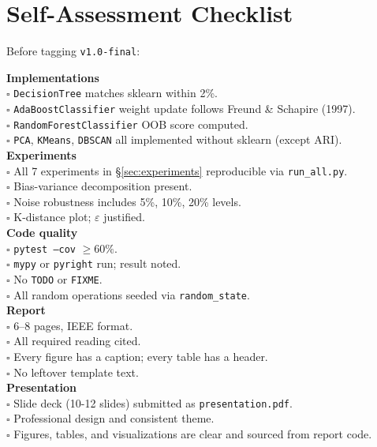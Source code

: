 \documentclass[11pt,a4paper]{article}
\begin{document}
\section{Self-Assessment Checklist}
Before tagging \texttt{v1.0-final}:
\begin{rubricbox}
\textbf{Implementations}\\
$\square$ \texttt{DecisionTree} matches sklearn within 2\%.\\
$\square$ \texttt{AdaBoostClassifier} weight update follows Freund \& Schapire (1997).\\
$\square$ \texttt{RandomForestClassifier} OOB score computed.\\
$\square$ \texttt{PCA}, \texttt{KMeans}, \texttt{DBSCAN} all implemented without sklearn (except ARI).\\
\smallskip\textbf{Experiments}\\
$\square$ All 7 experiments in \S\ref{sec:experiments} reproducible via \texttt{run\_all.py}.\\
$\square$ Bias-variance decomposition present.\\
$\square$ Noise robustness includes 5\%, 10\%, 20\% levels.\\
$\square$ K-distance plot; $\varepsilon$ justified.\\
\smallskip\textbf{Code quality}\\
$\square$ \texttt{pytest --cov} $\ge 60\%$.\\
$\square$ \texttt{mypy} or \texttt{pyright} run; result noted.\\
$\square$ No \texttt{TODO} or \texttt{FIXME}.\\
$\square$ All random operations seeded via \texttt{random\_state}.\\
\smallskip\textbf{Report}\\
$\square$ 6--8 pages, IEEE format.\\
$\square$ All required reading cited.\\
$\square$ Every figure has a caption; every table has a header.\\
$\square$ No leftover template text.\\
\smallskip\textbf{Presentation}\\
$\square$ Slide deck (10-12 slides) submitted as \texttt{presentation.pdf}.\\
$\square$ Professional design and consistent theme.\\
$\square$ Figures, tables, and visualizations are clear and sourced from report code.\\

\end{rubricbox}
\end{document}
